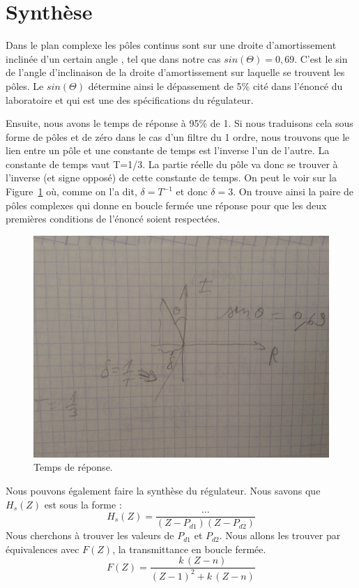 \section{Synthèse}

Dans le plan complexe les pôles continus sont sur une droite d'amortissement inclinée d'un certain angle \Theta{}, tel que dans notre cas $sin(\Theta) = 0,69$.
C'est le sin de l'angle d'inclinaison de la droite d'amortissement sur laquelle se trouvent les pôles.
Le $sin(\Theta)$ détermine ainsi le dépassement de 5\% cité dans l'énoncé du laboratoire et qui est une des spécifications du régulateur.

Ensuite, nous avons le temps de réponse à 95\% de 1.
Si nous traduisons cela sous forme de pôles et de zéro dans le cas d'un filtre du 1 ordre, nous trouvons que le lien entre un pôle et une constante de temps est l'inverse l'un de l'autre.
La constante de temps vaut T=1/3.
La partie réelle du pôle va donc se trouver à l'inverse (et signe opposé) de cette constante de temps.
On peut le voir sur la Figure~\ref{fig:temps-de-reponse} où, comme on l'a dit, $\delta = T^{-1}$ et donc $\delta = 3$.
On trouve ainsi la paire de pôles complexes  qui donne en boucle fermée une réponse pour que les deux premières conditions de l'énoncé soient respectées.

\begin{figure}[!ht]
    \centering
    \includegraphics[scale=0.1]{images/IMG_1681.jpg}
    \caption{Temps de réponse.}
    \label{fig:temps-de-reponse}
\end{figure}

Nous pouvons également faire la synthèse du régulateur.
Nous savons que $H_s(Z)$ est sous la forme :
\begin{equation}
    H_s(Z) = \frac{\dots}{(Z-P_{d1})(Z-P_{d2})}
\end{equation}
Nous cherchons à trouver les valeurs de $P_{d1}$ et $P_{d2}$.
Nous allons les trouver par équivalences avec $F(Z)$, la transmittance en boucle fermée.
\begin{equation}
    F(Z) = \frac{k\,(Z-n)}{(Z-1)^2+k\,(Z-n)}
\end{equation}

